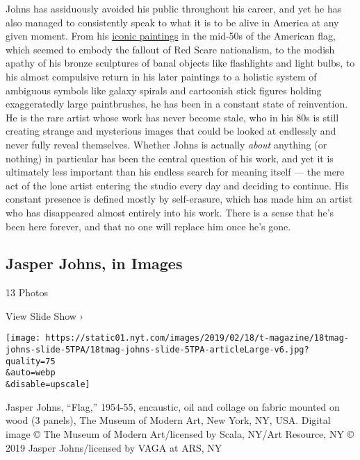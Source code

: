 Johns has assiduously avoided his public throughout his career, and yet
he has also managed to consistently speak to what it is to be alive in
America at any given moment. From his
\href{https://www.moma.org/collection/works/78805}{iconic paintings} in
the mid-50s of the American flag, which seemed to embody the fallout of
Red Scare nationalism, to the modish apathy of his bronze sculptures of
banal objects like flashlights and light bulbs, to his almost compulsive
return in his later paintings to a holistic system of ambiguous symbols
like galaxy spirals and cartoonish stick figures holding exaggeratedly
large paintbrushes, he has been in a constant state of reinvention. He
is the rare artist whose work has never become stale, who in his 80s is
still creating strange and mysterious images that could be looked at
endlessly and never fully reveal themselves. Whether Johns is actually
\emph{about} anything (or nothing) in particular has been the central
question of his work, and yet it is ultimately less important than his
endless search for meaning itself --- the mere act of the lone artist
entering the studio every day and deciding to continue. His constant
presence is defined mostly by self-erasure, which has made him an artist
who has disappeared almost entirely into his work. There is a sense that
he's been here forever, and that no one will replace him once he's gone.

\href{https://www.nytimes.com/slideshow/2019/02/18/t-magazine/jasper-johns-in-images.html}{}

\hypertarget{jasper-johns-in-images}{%
\subsection{Jasper Johns, in Images}\label{jasper-johns-in-images}}

13 Photos

View Slide Show ›

\texttt{[image: https://static01.nyt.com/images/2019/02/18/t-magazine/18tmag-johns-slide-5TPA/18tmag-johns-slide-5TPA-articleLarge-v6.jpg?quality=75\\\&auto=webp\\\&disable=upscale]}

Jasper Johns, ``Flag,'' 1954-55, encaustic, oil and collage on fabric
mounted on wood (3 panels), The Museum of Modern Art, New York, NY, USA.
Digital image © The Museum of Modern Art/licensed by Scala, NY/Art
Resource, NY © 2019 Jasper Johns/licensed by VAGA at ARS, NY

